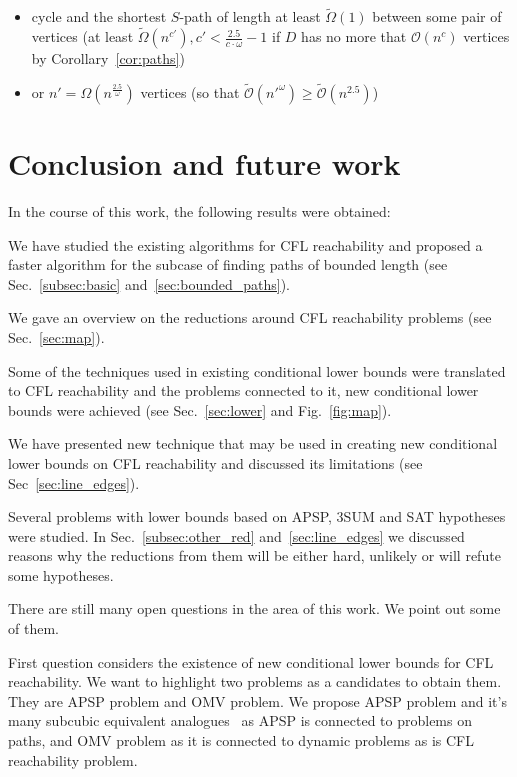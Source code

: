 \documentclass[12pt]{article}
\let\origenumerate\enumerate
\let\origendenumerate\endenumerate
\renewenvironment{enumerate}{\origenumerate[topsep = 0pt, noitemsep]}{\origendenumerate}
\begin{document}
\begin{itemize}
    \item[-] cycle and the shortest $S$-path of length at least $\tilde{\Omega}(1)$ between some pair of vertices (at least $\tilde{\Omega}(n^{c'}), c' < \frac{2.5}{c \cdot \omega} - 1$ if $D$ has no more that $\mathcal{O}(n^c)$ vertices by Corollary~\ref{cor:paths})
    \item[-] or $n' = \Omega(n^{\frac{2.5}{\omega}})$ vertices (so that $\tilde{\mathcal{O}}(n'^{\omega}) \ge \tilde{\mathcal{O}}(n^{2.5})$)
\end{itemize} 

\section{Conclusion and future work}

In the course of this work, the following results were obtained:

\begin{enumerate}
    \item[1.] We have studied the existing algorithms for CFL reachability and proposed a faster algorithm for the subcase of finding paths of bounded length (see Sec.~\ref{subsec:basic} and~\ref{sec:bounded_paths}).
    \item[2.] We gave an overview on the reductions around CFL reachability problems (see Sec.~\ref{sec:map}).
    \item[3.1.] Some of the techniques used in existing conditional lower bounds were translated to CFL reachability and the problems connected to it, new conditional lower bounds were achieved (see Sec.~\ref{sec:lower} and Fig.~\ref{fig:map}). 
    \item[3.2.] We have presented new technique that may be used in creating new conditional lower bounds on CFL reachability and discussed its limitations (see Sec~\ref{sec:line_edges}).
    \item[3.3.] Several problems with lower bounds based on APSP, 3SUM and SAT hypotheses were studied. In Sec.~\ref{subsec:other_red} and~\ref{sec:line_edges} we discussed reasons why the reductions from them will be either hard, unlikely or will refute some hypotheses.
\end{enumerate}

There are still many open questions in the area of this work. We point out some of them. 

First question considers the existence of new conditional lower bounds for CFL reachability. We want to highlight two problems as a candidates to obtain them. They are APSP problem and OMV problem. We propose APSP problem and it's many subcubic equivalent analogues~\cite{10.1145/3186893} as APSP is connected to problems on paths, and OMV problem as it is connected to dynamic problems as is CFL reachability problem. 
\end{document}
